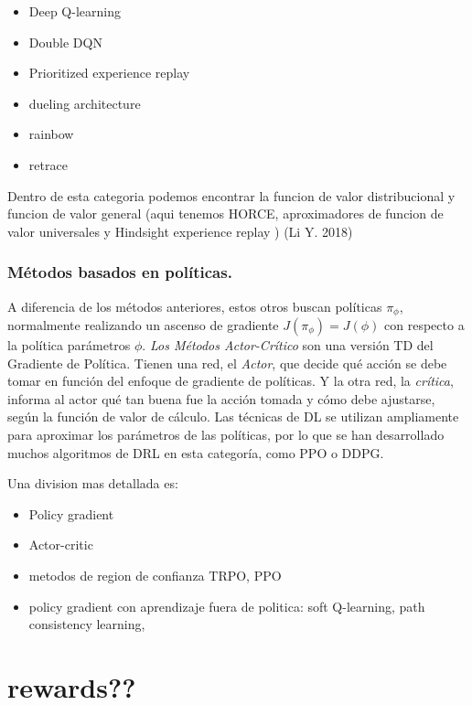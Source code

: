 \documentclass{svproc}
\begin{document}
\begin{itemize}
    \item Deep Q-learning
    \item Double DQN
    \item Prioritized experience replay
    \item dueling architecture
    \item rainbow
    \item retrace
\end{itemize}
Dentro de esta categoria podemos encontrar la funcion de valor distribucional y funcion de valor general (aqui tenemos HORCE, aproximadores de funcion de valor universales y Hindsight experience replay ) (Li Y. 2018)



\subsubsection{Métodos basados en políticas.}\label{ss:policybased}
A diferencia de los métodos anteriores, estos otros buscan políticas $\pi_{\phi}$, normalmente realizando un ascenso de gradiente $J\left(\pi_{\phi}\right)=J(\phi)$ con respecto a la política parámetros $\phi$. \emph{Los Métodos Actor-Crítico} son una versión TD del Gradiente de Política. Tienen una red, el \emph{Actor}, que decide qué acción se debe tomar en función del enfoque de gradiente de políticas. Y la otra red, la \emph{crítica}, informa al actor qué tan buena fue la acción tomada y cómo debe ajustarse, según la función de valor de cálculo. Las técnicas de DL se utilizan ampliamente para aproximar los parámetros de las políticas, por lo que se han desarrollado muchos algoritmos de DRL en esta categoría, como PPO \cite{schulman2017proximal} o DDPG\cite{lillicrap2015continuous}.

Una division mas detallada es:

\begin{itemize}
    \item Policy gradient
    \item Actor-critic
    \item metodos de region de confianza TRPO, PPO
    \item policy gradient con aprendizaje fuera de politica: soft Q-learning, path consistency learning, 
    
\end{itemize}

\section{rewards??}
\end{document}
